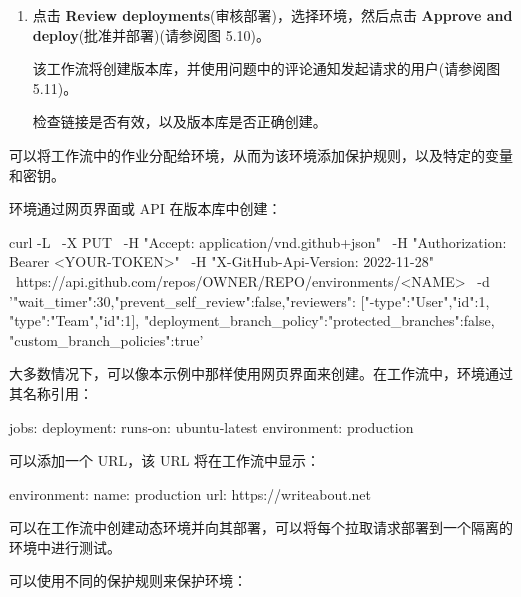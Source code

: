\begin{enumerate}
\item 
点击 \textbf{Review deployments}(审核部署)，选择环境，然后点击 \textbf{Approve and deploy}(批准并部署)(请参阅图 5.10)。


该工作流将创建版本库，并使用问题中的评论通知发起请求的用户(请参阅图 5.11)。


检查链接是否有效，以及版本库是否正确创建。

\end{enumerate}


可以将工作流中的作业分配给环境，从而为该环境添加保护规则，以及特定的变量和密钥。


环境通过网页界面或 API 在版本库中创建：

\begin{shell}
curl -L \
  -X PUT \
  -H "Accept: application/vnd.github+json" \
  -H "Authorization: Bearer <YOUR-TOKEN>" \
  -H "X-GitHub-Api-Version: 2022-11-28" \
  https://api.github.com/repos/OWNER/REPO/environments/<NAME> \
  -d '{"wait_timer":30,"prevent_self_review":false,"reviewers": [{"-type":"User","id":1}, {"type":"Team","id":1}], "deployment_branch_policy":{"protected_branches":false, "custom_branch_policies":true}}'
\end{shell}

大多数情况下，可以像本示例中那样使用网页界面来创建。在工作流中，环境通过其名称引用：

\begin{shell}
jobs:
  deployment:
    runs-on: ubuntu-latest
    environment: production
\end{shell}

可以添加一个 URL，该 URL 将在工作流中显示：

\begin{shell}
environment:
  name: production
  url: https://writeabout.net
\end{shell}

可以在工作流中创建动态环境并向其部署，可以将每个拉取请求部署到一个隔离的环境中进行测试。

可以使用不同的保护规则来保护环境：

